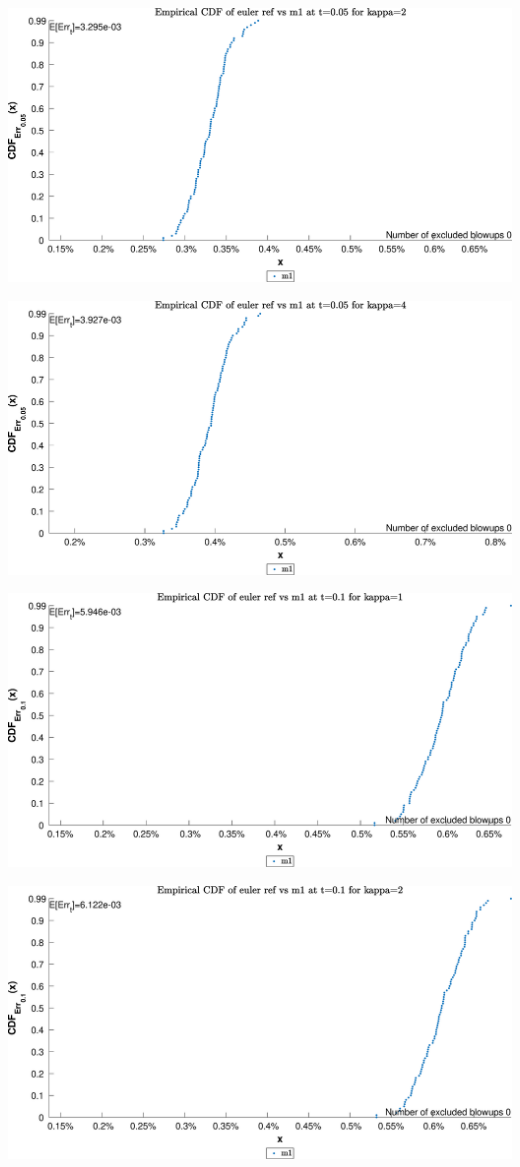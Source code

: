 \begin{landscape}
\includegraphics[width=.95\columnwidth]{CDF/CDFEulerRef_14}
\end{landscape}
\begin{landscape}
\includegraphics[width=.95\columnwidth]{CDF/CDFEulerRef_15}
\end{landscape}
\begin{landscape}
\includegraphics[width=.95\columnwidth]{CDF/CDFEulerRef_16}
\end{landscape}
\begin{landscape}
\includegraphics[width=.95\columnwidth]{CDF/CDFEulerRef_17}
\end{landscape}
